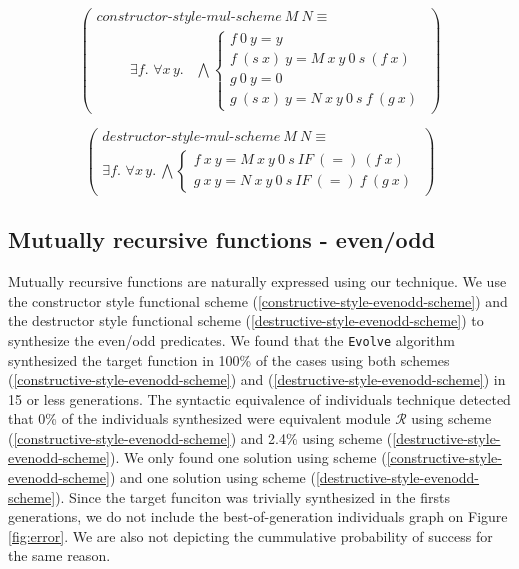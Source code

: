 \begin{equation}
  \left(\begin{array}{l}
    constructor\textrm{-}style\textrm{-}mul\textrm{-}scheme\ M\ N \equiv \\
    \quad \quad \begin{array}{c}
      \exists f.\,\, \forall x\, y. \phantom{,}
    \end{array}
    \bigwedge \left\{
    \begin{array}{l}
      f\ 0\ y = y\\
      f\ (s\ x)\ y = M\ x\ y\ 0\ s\ (f\ x)\\
      g\ 0\ y = 0\\
      g\ (s\ x)\ y = N\ x\ y\ 0\ s\ f\ (g\ x)
    \end{array}
    \right.
  \end{array}\right)
  \label{constructive-style-mul-scheme}
\end{equation}

\begin{equation}
  \left(\begin{array}{l}
    destructor\textrm{-}style\textrm{-}mul\textrm{-}scheme\ M\ N \equiv \\
    \exists f.\,\, \forall x\, y.\ \bigwedge \left\{
    \begin{array}{l}
      f\ x\ y  =  M\ x\ y\ 0\ s\ IF\ (=)\ (f\ x)\\
      g\ x\ y  =  N\ x\ y\ 0\ s\ IF\ (=)\ f\ (g\ x)
    \end{array}\right.
  \end{array}\right)
  \label{destructive-style-mul-scheme}
\end{equation}

\subsection{Mutually recursive functions - even/odd}
Mutually recursive functions are naturally expressed using our technique. We use the constructor style functional scheme (\ref{constructive-style-evenodd-scheme}) and the destructor style functional scheme (\ref{destructive-style-evenodd-scheme}) to synthesize the even/odd predicates. We found that the {\tt Evolve} algorithm synthesized the target function in 100\% of the cases using both schemes (\ref{constructive-style-evenodd-scheme}) and (\ref{destructive-style-evenodd-scheme}) in 15 or less generations. The syntactic equivalence of individuals technique detected that 0\% of the individuals synthesized were equivalent module $\mathcal{R}$ using scheme (\ref{constructive-style-evenodd-scheme}) and 2.4\% using scheme (\ref{destructive-style-evenodd-scheme}). \cbstart We only found one solution using scheme (\ref{constructive-style-evenodd-scheme}) and one solution using scheme (\ref{destructive-style-evenodd-scheme}). Since the target funciton was trivially synthesized in the firsts generations, we do not include the best-of-generation individuals graph on Figure \ref{fig:error}. We are also not depicting the cummulative probability of success for the same reason.\cbend

